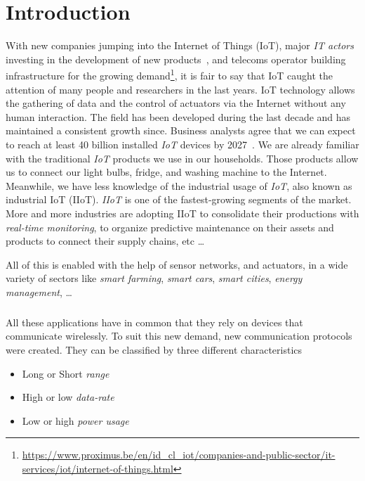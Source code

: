\chapter{Introduction}

With new companies jumping into the Internet of Things (IoT), 
major \emph{IT actors} investing in the development of new
products~\cite{fortuneiot2019}, and telecoms operator building infrastructure 
for the growing
demand\footnote{\url{https://www.proximus.be/en/id_cl_iot/companies-and-public-sector/it-services/iot/internet-of-things.html}},
it is fair to say that IoT caught the attention of many people and researchers
in the last years.
IoT technology allows the gathering of data and the control of actuators via
the Internet without any human interaction.
The field has been developed during the last decade and has maintained a
consistent growth since.
Business analysts agree that we can expect to reach at least 40 billion
installed \emph{IoT} devices by 2027~\cite{businessinsider2020}.
We are already familiar with the traditional \emph{IoT} products
we use in our households. Those products allow us to connect our light bulbs,
fridge, and washing machine to the Internet.
Meanwhile, we have less knowledge of the industrial usage of \emph{IoT}, also
known as industrial IoT (IIoT). \emph{IIoT} is one of the fastest-growing
segments of the market.
More and more industries are adopting IIoT to consolidate their productions
with \emph{real-time monitoring}, to organize predictive maintenance on their
assets and products to connect their supply chains, etc \ldots

All of this is enabled with the help of sensor networks, and actuators, in a
wide variety of sectors like \emph{smart farming}, \emph{smart cars},
\emph{smart cities}, \emph{energy management}, \ldots

\paragraph{}

All these applications have in common that they rely on devices that
communicate wirelessly.
To suit this new demand, new communication protocols were created.
They can be classified by three different characteristics

\begin{itemize}
    \item Long or Short \emph{range}
    \item High or low \emph{data-rate}
    \item Low or high \emph{power usage} 
\end{itemize}

